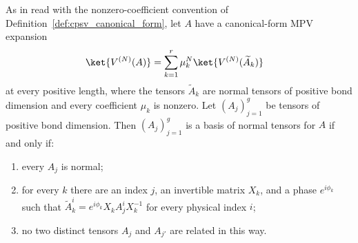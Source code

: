 \begin{theorem}
    \label{thm:cpsv_bnt_characterization}
    \leanok
    As in \cite[Proposition~2.7]{Cirac2016MPDO_arXiv} read with the
    nonzero-coefficient convention of Definition~\ref{def:cpsv_canonical_form},
    let $A$ have a canonical-form MPV expansion
    \begin{align}
        \ket{V^{(N)}(A)}
         & = \sum_{k=1}^{r}\mu_k^N\ket{V^{(N)}(\widetilde A_k)}
        \notag
    \end{align}
    at every positive length, where the tensors $\widetilde A_k$ are normal
    tensors of positive bond dimension and every coefficient $\mu_k$ is
    nonzero. Let $(A_j)_{j=1}^{g}$ be tensors of
    positive bond dimension. Then
    $(A_j)_{j=1}^{g}$ is a basis of normal tensors for $A$ if and only if:
    \begin{enumerate}
        \item every $A_j$ is normal;
        \item for every $k$ there are an index $j$, an
              invertible matrix $X_k$, and a phase $e^{i\phi_k}$ such that
              $\widetilde A_k^i=e^{i\phi_k}X_kA_j^iX_k^{-1}$ for every
              physical index $i$;
        \item no two distinct tensors $A_j$ and $A_{j'}$ are related in this
              way.
    \end{enumerate}
\end{theorem}


